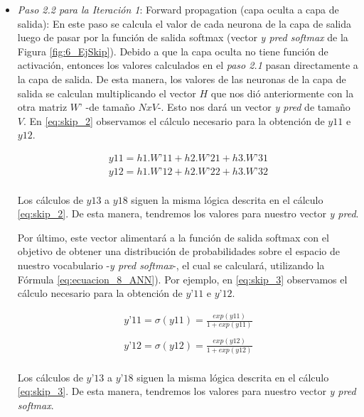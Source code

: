 \documentclass[12pt,a4paper]{article}
\begin{document}
\begin{sloppypar}
\begin{enumerate}
\begin{itemize}
\begin{itemize}
\item \textit{Paso 2.2 para la Iteración 1}: Forward propagation (capa oculta a capa de salida): En este paso se calcula el valor de cada neurona de la capa de salida luego de pasar por la función de salida softmax (vector \textit{y pred softmax} de la Figura \ref{fig:6_EjSkip}). Debido a que la capa oculta no tiene función de activación, entonces los valores calculados en el \textit{paso 2.1} pasan directamente a la capa de salida. De esta manera, los valores de las neuronas de la capa de salida se calculan multiplicando el vector $H$ que nos dió anteriormente con la otra matriz $W’$ -de tamaño $N x V$-. Esto nos dará un vector \textit{y pred} de tamaño $V$. En \ref{eq:skip_2} observamos el cálculo necesario para la obtención de $y11$ e $y12$.

\begin{equation}\label{eq:skip_2}
\begin{gathered}
y11 = h1 . W’11 + h2 . W’21 + h3 . W’31  \\
y12 = h1 . W’12 + h2 . W’22 + h3 . W’32
\end{gathered}
\end{equation}
\\
Los cálculos de $y13$ a $y18$ siguen la misma lógica descrita en el cálculo \ref{eq:skip_2}. De esta manera, tendremos los valores para nuestro vector \textit{y pred}.

Por último, este vector alimentará a la función de salida softmax con el objetivo de obtener una distribución de probabilidades sobre el espacio de nuestro vocabulario -\textit{y pred softmax}-, el cual se  calculará, utilizando la Fórmula \ref{eq:ecuacion_8_ANN}). Por ejemplo, en \ref{eq:skip_3} observamos el cálculo necesario para la obtención de $y’11$ e $y’12$.

\begin{equation}\label{eq:skip_3}
\begin{gathered}
y’11 = \sigma(y11) = \frac{exp(y11)}{1 + exp(y11)} \\ \\
y’12 = \sigma(y12) = \frac{exp(y12)}{1 + exp(y12)}
\end{gathered}
\end{equation}
\\
Los cálculos de $y’13$ a $y’18$ siguen la misma lógica descrita en el cálculo \ref{eq:skip_3}. De esta manera, tendremos los valores para nuestro vector \textit{y pred softmax}. 

\end{itemize}


\end{itemize}
\end{enumerate}
\end{sloppypar}
\end{document}
